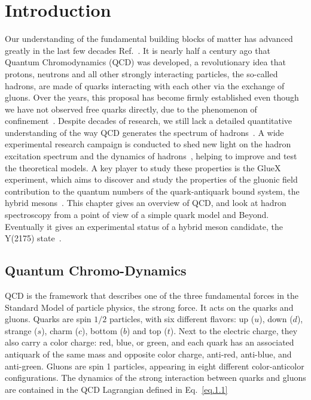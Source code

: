 \chapter{Introduction}
\label{chap.intro}

Our understanding of the fundamental building blocks of matter has advanced greatly in the last few decades Ref.~\cite{Fritzsch94,Gell64,Gell62,Neeman61,Zweig64}. It is nearly half a century ago that Quantum Chromodynamics (QCD) was developed, a revolutionary idea that protons, neutrons and all other strongly interacting particles, the so-called hadrons, are made of quarks interacting with each other via the exchange of gluons. Over the years, this proposal has become firmly established even though we have not observed free quarks directly, due to the phenomenon of confinement~\cite{Gross05}. Despite decades of research, we still lack a detailed quantitative understanding of the way QCD generates the spectrum of hadrons~\cite{Wilczek05}. A wide experimental research campaign is conducted to shed new light on the hadron excitation spectrum and the dynamics of hadrons~\cite{Tanabashi18}, helping to improve and test the theoretical models. A key player to study these properties is the GlueX experiment, which aims to discover and study the properties of the gluonic field contribution to the quantum numbers of the quark-antiquark bound system, the hybrid mesons~\cite{Meyer18}. This chapter gives an overview of QCD, and look at hadron spectroscopy from a point of view of a simple quark model and Beyond. Eventually it gives an experimental status of a hybrid meson candidate, the Y(2175) state~\cite{Gui07}.

\section{Quantum Chromo-Dynamics}
\label{p.1.1}

QCD is the framework that describes one of the three fundamental forces in the Standard Model of particle physics, the strong force. It acts on the quarks and gluons. Quarks are spin $1/2$ particles, with six different flavors: up ($u$), down ($d$), strange ($s$), charm ($c$), bottom ($b$) and top ($t$). Next to the electric charge, they also carry a color charge: red, blue, or green, and each quark has an associated antiquark of the same mass and opposite color charge, anti-red, anti-blue, and anti-green. Gluons are spin 1 particles, appearing in eight different color-anticolor configurations. The dynamics of the strong interaction between quarks and gluons are contained in the QCD Lagrangian defined in Eq.~\ref{eq.1.1}


